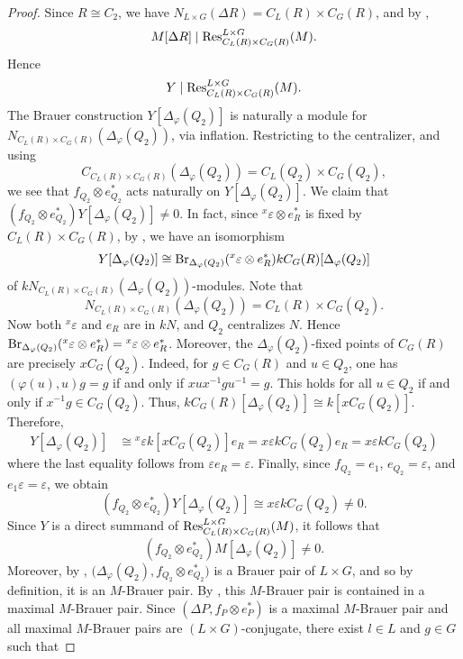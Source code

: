 \begin{proof}
Since $R\cong C_2$, we have $N_{L\times G}(\Delta R)=C_L(R)\times C_G(R)$, and by \cite[Proposition~5.8.7]{LinckelmannVol1},
\[
M[\Delta R]\mid
\operatorname{Res}_{C_L(R)\times C_G(R)}^{L\times G}(M).
\]
Hence
\[
Y\mid
\operatorname{Res}_{C_L(R)\times C_G(R)}^{L\times G}(M).
\]
The Brauer construction
$Y[\Delta_\varphi(Q_2)]$ is naturally a module for $N_{C_L(R)\times C_G(R)}(\Delta_\varphi(Q_2))$, via inflation. Restricting to the centralizer, and using
\[
C_{C_L(R)\times C_G(R)}(\Delta_\varphi(Q_2))=C_L(Q_2)\times C_G(Q_2),
\]
we see that $f_{Q_2}\otimes e_{Q_2}^*$ acts naturally on $Y[\Delta_\varphi(Q_2)]$. We claim that $(f_{Q_2}\otimes e_{Q_2}^*)Y[\Delta_\varphi(Q_2)]\neq 0$. In fact, since ${}^{x}\varepsilon\otimes e_R^*$ is fixed by $C_L(R)\times C_G(R)$, by \cite[Lemma~3.7]{BoltjePerepelitsky}, we have an isomorphism
\[
Y[\Delta_\varphi(Q_2)]\cong \operatorname{Br}_{\Delta_\varphi(Q_2)}({}^{x}\varepsilon\otimes e_R^*) kC_G(R)[\Delta_\varphi(Q_2)]
\]
of $kN_{C_L(R)\times C_G(R)}(\Delta_\varphi(Q_2))$-modules. Note that
\[
N_{C_L(R)\times C_G(R)}(\Delta_\varphi(Q_2))=C_L(R)\times C_G(Q_2).
\]
Now both ${}^{x}\varepsilon$ and $e_R$ are in $kN$, and $Q_2$ centralizes $N$. Hence $\operatorname{Br}_{\Delta_\varphi(Q_2)}
({}^{x}\varepsilon\otimes e_R^*)={}^{x}\varepsilon\otimes e_R^*$. Moreover, the $\Delta_\varphi(Q_2)$-fixed points of $C_G(R)$ are precisely $xC_G(Q_2)$. Indeed, for $g\in C_G(R)$ and $u\in Q_2$, one has $(\varphi(u),u)g=g$ if and only if $xux^{-1}gu^{-1}=g$. This holds for all $u\in Q_2$ if and only if $x^{-1}g\in C_G(Q_2)$. Thus, $kC_G(R)[\Delta_\varphi(Q_2)] \cong k[xC_G(Q_2)]$. Therefore,
\begin{align*}
	Y[\Delta_\varphi(Q_2)]&\cong {}^{x}\varepsilon k[xC_G(Q_2)]e_R=x\varepsilon kC_G(Q_2)e_R=x\varepsilon kC_G(Q_2)
\end{align*}
where the last equality follows from
$\varepsilon e_R=\varepsilon$. Finally, since $f_{Q_2}=e_1$, $e_{Q_2}=\varepsilon$, and
$e_1\varepsilon=\varepsilon$, we obtain
\[
(f_{Q_2}\otimes e_{Q_2}^*)
Y[\Delta_\varphi(Q_2)]\cong x\varepsilon kC_G(Q_2)\neq0.
\]
Since $Y$ is a direct summand of
$\operatorname{Res}_{C_L(R)\times C_G(R)}^{L\times G}(M)$, it follows that
\[
(f_{Q_2}\otimes e_{Q_2}^*) M[\Delta_\varphi(Q_2)]\neq0.
\]
Moreover, by \cite[Remark~10.2(a)]{BoltjePerepelitsky}, $\bigl(\Delta_\varphi(Q_2),f_{Q_2}\otimes e_{Q_2}^*\bigr)$ is a Brauer pair of $L\times G$, and so by definition, it is an $M$-Brauer pair. By \cite[Proposition~5.3(c)]{BoltjePerepelitsky}, this $M$-Brauer pair is contained in a maximal $M$-Brauer pair. Since $(\Delta P,f_P\otimes e_P^*)$
is a maximal $M$-Brauer pair and all maximal $M$-Brauer pairs are $(L\times G)$-conjugate, there exist $l\in L$ and $g\in G$ such that

\end{proof}

